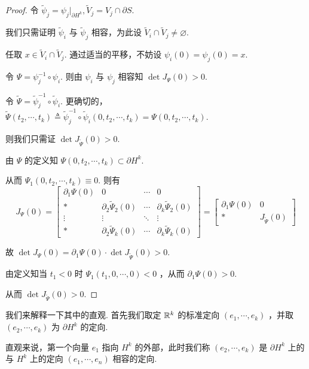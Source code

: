 \begin{proof}
    令 $\widetilde\psi_j=\psi_j|_{\partial H^k},\widetilde{V}_j=V_j\cap\partial S$.

    我们只需证明 $\widetilde\psi_i$ 与 $\widetilde\psi_j$ 相容，为此设 $\widetilde{V}_i\cap\widetilde{V}_j\ne\varnothing$.


    任取 $x\in\widetilde{V}_i\cap\widetilde{V}_j$. 通过适当的平移，不妨设 $\psi_i(0)=\psi_j(0)=x$.

    令 $\Psi=\psi_j^{-1}\circ\psi_i$. 则由 $\psi_i$ 与 $\psi_j$ 相容知 $\det J_\Psi(0)>0$.

    令 $\widetilde\Psi=\widetilde\psi_j^{-1}\circ\widetilde\psi_i$. 更确切的，$\widetilde\Psi(t_2,\cdots,t_k)\triangleq\widetilde\psi_j^{-1}\circ\widetilde\psi_i(0,t_2,\cdots,t_k)=\Psi(0,t_2,\cdots,t_k)$.

    则我们只需证 $\det J_{\widetilde\Psi}(0)>0$.

    由 $\Psi$ 的定义知 $\Psi(0,t_2,\cdots,t_k)\subset\partial H^k$.

    从而 $\Psi_1(0,t_2,\cdots,t_k)\equiv 0$. 则有
$$
J_\Psi(0)=\left[\begin{array}{c|ccc}
    \partial_1\Psi(0) & 0 & \cdots & 0\\
    \hline
    * & \partial_2\widetilde\Psi_2(0) & \cdots & \partial_k\widetilde\Psi_2(0)\\
    \vdots & \vdots & \ddots & \vdots\\
    * & \partial_2\widetilde\Psi_k(0) & \cdots & \partial_k\widetilde\Psi_k(0)
\end{array}\right]=\begin{bmatrix}
    \partial_1\Psi(0) & 0\\
    * & J_{\widetilde\Psi}(0)
\end{bmatrix}
$$

    故 $\det J_\Psi(0)=\partial_1\Psi(0)\cdot\det J_{\widetilde\Psi}(0)>0$.

    由定义知当 $t_1<0$ 时 $\Psi_1(t_1,0,\cdots,0)<0$ ，从而 $\partial_1\Psi(0)>0$.

    从而 $\det J_{\widetilde\Psi}(0)>0$.
\end{proof}

我们来解释一下其中的直观. 首先我们取定 $\mathbb{R}^k$ 的标准定向 $(e_1,\cdots,e_k)$ ，并取 $(e_2,\cdots,e_k)$ 为 $\partial H^k$ 的定向.


直观来说，第一个向量 $e_1$ 指向 $H^k$ 的外部，此时我们称 $(e_2,\cdots,e_k)$ 是 $\partial H^k$ 上的与 $H^k$ 上的定向 $(e_1,\cdots,e_n)$ 相容的定向.

